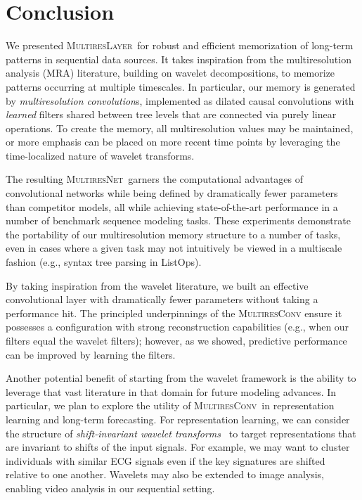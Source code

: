\documentclass{article}
\theoremstyle{plain}
\theoremstyle{definition}
\theoremstyle{remark}
\newcommand{\ourmodel}{\textsc{MultiresNet}}
\newcommand{\ourlayer}{\textsc{MultiresLayer}}
\newcommand{\ourconv}{\textsc{MultiresConv}}
\begin{document}
\section{Conclusion}
We presented \ourlayer\ for robust and efficient memorization of long-term patterns in sequential data sources.  
It takes inspiration from the multiresolution analysis (MRA) literature, building on wavelet decompositions, to memorize patterns occurring at multiple timescales.  In particular, our memory is generated by \emph{multiresolution convolution}s, implemented as dilated causal convolutions with \emph{learned} filters shared between tree levels that are connected via purely linear operations.  To create the memory, all multiresolution values may be maintained, or more emphasis can be placed on more recent time points by leveraging the time-localized nature of wavelet transforms.

The resulting \ourmodel\ garners the computational advantages of convolutional networks while being defined by dramatically fewer parameters than competitor models, all while achieving state-of-the-art performance in a number of benchmark sequence modeling tasks.  
These experiments demonstrate the portability of our multiresolution memory structure to a number of tasks, even in cases where a given task may not intuitively be viewed in a multiscale fashion (e.g., syntax tree parsing in ListOps).

By taking inspiration from the wavelet literature, we built an effective convolutional layer with dramatically fewer parameters without taking a performance hit.  The principled underpinnings of the \textsc{MultiresConv} ensure it possesses a configuration with strong reconstruction capabilities (e.g., when our filters equal the wavelet filters); however, as we showed, predictive performance can be improved by learning the filters.

Another potential benefit of starting from the wavelet framework is the ability to leverage that vast literature in that domain for future modeling advances.  In particular, we plan to explore the utility of \ourconv\ in representation learning and long-term forecasting. For representation learning, we can consider the structure of \emph{shift-invariant wavelet transforms}~\cite{kingsbury1998dual,selesnick2005dual} to target representations that are invariant to shifts of the input signals.  For example, we may want to cluster individuals with similar ECG signals even if the key signatures are shifted relative to one another.  Wavelets may also be extended to image analysis, enabling video analysis in our sequential setting.
\end{document}
